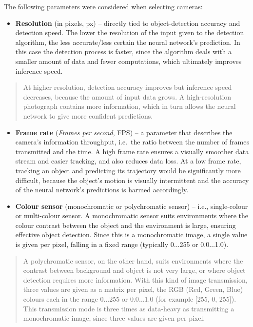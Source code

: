 The following parameters were considered when selecting cameras:

\begin{itemize}
\tightlist
\item
  \textbf{Resolution} (in pixels, px) -- directly tied to object-detection accuracy and detection speed. The lower the resolution of the input given to the detection algorithm, the less accurate/less certain the neural network's prediction. In this case the detection process is faster, since the algorithm deals with a smaller amount of data and fewer computations, which ultimately improves inference speed.
\end{itemize}

\begin{quote}
At higher resolution, detection accuracy improves but inference speed decreases, because the amount of input data grows. A high-resolution photograph contains more information, which in turn allows the neural network to give more confident predictions.
\end{quote}

\begin{itemize}
\item
  \textbf{Frame rate} (\emph{Frames per second}, FPS) -- a parameter that describes the camera's information throughput, i.e.\ the ratio between the number of frames transmitted and the time. A high frame rate ensures a visually smoother data stream and easier tracking, and also reduces data loss. At a low frame rate, tracking an object and predicting its trajectory would be significantly more difficult, because the object's motion is visually intermittent and the accuracy of the neural network's predictions is harmed accordingly.
\item
  \textbf{Colour sensor} (monochromatic or polychromatic sensor) -- i.e., single-colour or multi-colour sensor. A monochromatic sensor suits environments where the colour contrast between the object and the environment is large, ensuring effective object detection. Since this is a monochromatic image, a single value is given per pixel, falling in a fixed range (typically 0$\dots$255 or 0.0$\dots$1.0).
\end{itemize}

\begin{quote}
A polychromatic sensor, on the other hand, suits environments where the contrast between background and object is not very large, or where object detection requires more information. With this kind of image transmission, three values are given as a matrix per pixel, the RGB (Red, Green, Blue) colours each in the range 0$\dots$255 or 0.0$\dots$1.0 (for example [255, 0, 255]). This transmission mode is three times as data-heavy as transmitting a monochromatic image, since three values are given per pixel.
\end{quote}

